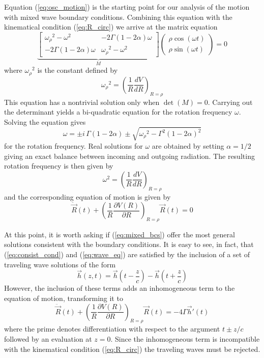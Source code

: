 Equation (\ref{eq:osc_motion}) is the starting point for our
analysis of the motion with mixed wave boundary conditions.
Combining this equation with the kinematical condition
(\ref{eq:R_circ}) we arrive at the matrix equation
\[
            \underbrace{
                  \left[
			       \begin{array}{cc}
				   {\omega _{\rho} }^2 - \omega ^2 & - 2 \Gamma (1 - 2 \alpha) \omega \\
                   - 2 \Gamma (1 - 2 \alpha) \omega & {\omega _{\rho} }^2 - \omega ^2 				    
    		       \end{array}
			      \right]
				 }_{M}
				  \left(
				   \begin{array}{c}
				    \rho \cos ( \omega t) \\
					\rho \sin ( \omega t)
				   \end{array}
				  \right)
				  = 
				  0
\] 
where ${\omega _{\rho}}^2$ is the constant defined by
\[
  {\omega _{\rho}}^2 = \left(\frac{1}{R} \frac{dV}{dR}\right)_{R=\rho}
\]
This equation has a nontrivial solution only when $\det(M) = 0$.  
Carrying out the determinant yields a bi-quadratic equation for the
rotation frequency $\omega$.
Solving the equation gives
\[
  \omega = \pm i \, \Gamma (1-2\alpha)  
           \pm \sqrt{ {\omega _{\rho}}^2 - \Gamma ^ 2 (1 - 2 \alpha)^2}
\]
for the rotation frequency.
Real solutions for $\omega$ are obtained by setting $\alpha = 1/2$
giving an exact balance between incoming and outgoing radiation.
The resulting rotation frequency is then given by
\[
  \omega^2 = \left( \frac{1}{R} \frac{dV}{dR} \right)_{R = \rho}
\]
and the corresponding equation of motion is given by
\begin{equation}\label{eq:osc_motion_bal}
 {\ddot {\vec R}}(t) 
  + \left( \frac{1}{R} \frac{\partial V(R)}{\partial R} \right)_{R=\rho} {\vec R}(t) = 0
\end{equation}

At this point, it is worth asking if (\ref{eq:mixed_bcs}) offer the most general
solutions consistent with the boundary conditions.  
It is easy to see, in fact, that (\ref{eq:consist_cond}) and (\ref{eq:wave_eq})
are satisfied by the inclusion of a set of traveling wave 
solutions of the form
\[
  {\vec h}(z,t) = {\vec h}\left(t - \frac{z}{c}\right) 
                - {\vec h}\left(t + \frac{z}{c}\right)
\] 
However, the inclusion of these terms adds an inhomogeneous term to 
the equation of motion, transforming it to
\begin{equation}\label{eq:osc_motion_homo}
 {\ddot {\vec R}}(t) 
  + \left( \frac{1}{R} \frac{\partial V(R)}{\partial R} \right)_{R=\rho} {\vec R}(t) = 
   - 4 \Gamma {\vec h}'(t)
\end{equation}
where the prime denotes differentiation with respect to the argument 
$t \pm z/c$ followed by an evaluation at $z=0$.
Since the inhomogeneous term is incompatible with the kinematical 
condition (\ref{eq:R_circ}) the traveling waves must be rejected. 
 
